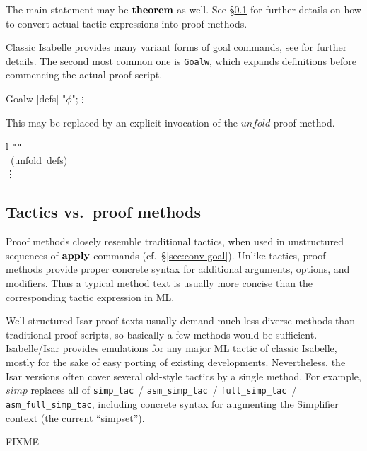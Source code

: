 The main statement may be ${\mathord{\mathbf{theorem}}}$ as well.  See \S\ref{sec:conv-tac}
for further details on how to convert actual tactic expressions into proof
methods.

\medskip Classic Isabelle provides many variant forms of goal commands, see
\cite{isabelle-ref} for further details.  The second most common one is
\texttt{Goalw}, which expands definitions before commencing the actual proof
script.
\begin{ttbox}
Goalw [defs] "\(\phi\)";
  \(\vdots\)
\end{ttbox}
This may be replaced by an explicit invocation of the $unfold$ proof method.
\begin{matharray}{l}
\texttt"{\phi}\texttt" \\
\quad {}~(unfold~defs) \\
\quad \vdots \\
\end{matharray}



\subsection{Tactics vs.\ proof methods}\label{sec:conv-tac}

Proof methods closely resemble traditional tactics, when used in unstructured
sequences of ${\mathord{\mathbf{apply}}}$ commands (cf.\ \S\ref{sec:conv-goal}).
Unlike tactics, proof methods provide proper concrete syntax for additional
arguments, options, and modifiers.  Thus a typical method text is usually more
concise than the corresponding tactic expression in ML.

Well-structured Isar proof texts usually demand much less diverse methods than
traditional proof scripts, so basically a few methods would be sufficient.
Isabelle/Isar provides emulations for any major ML tactic of classic Isabelle,
mostly for the sake of easy porting of existing developments.  Nevertheless,
the Isar versions often cover several old-style tactics by a single method.
For example, $simp$ replaces all of \texttt{simp_tac}~/
\texttt{asm_simp_tac}~/ \texttt{full_simp_tac}~/ \texttt{asm_full_simp_tac},
including concrete syntax for augmenting the Simplifier context (the current
``simpset'').

\bigskip

FIXME

